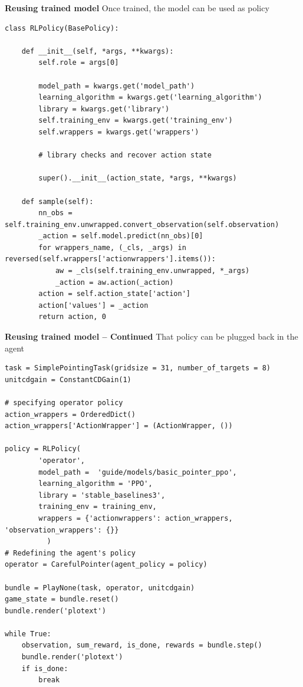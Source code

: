 \documentclass[11pt, xcolor = {dvipsnames}]{beamer}
\begin{document}
\begin{frame}[fragile]{\textbf{Reusing trained model}}
Once trained, the model can be used as policy
\begin{adjustbox}{width=\textwidth}
\lstset{language=Python}
\lstset{frame=lines}
\lstset{basicstyle=\footnotesize}
\begin{lstlisting}
class RLPolicy(BasePolicy):
   
    def __init__(self, *args, **kwargs):
        self.role = args[0]
        
        model_path = kwargs.get('model_path')
        learning_algorithm = kwargs.get('learning_algorithm')
        library = kwargs.get('library')
        self.training_env = kwargs.get('training_env')
        self.wrappers = kwargs.get('wrappers')
        
        # library checks and recover action state

        super().__init__(action_state, *args, **kwargs)

    def sample(self):
        nn_obs = self.training_env.unwrapped.convert_observation(self.observation)
        _action = self.model.predict(nn_obs)[0]
        for wrappers_name, (_cls, _args) in reversed(self.wrappers['actionwrappers'].items()):
            aw = _cls(self.training_env.unwrapped, *_args)
            _action = aw.action(_action)
        action = self.action_state['action']
        action['values'] = _action
        return action, 0
\end{lstlisting}
\end{adjustbox}
\end{frame}

\begin{frame}[fragile]{\textbf{Reusing trained model -- Continued}}
That policy can be plugged back in the agent
\begin{adjustbox}{width=.95\textwidth}
\lstset{language=Python}
\lstset{frame=lines}
\lstset{basicstyle=\footnotesize}
\begin{lstlisting}
task = SimplePointingTask(gridsize = 31, number_of_targets = 8)
unitcdgain = ConstantCDGain(1)

# specifying operator policy
action_wrappers = OrderedDict()
action_wrappers['ActionWrapper'] = (ActionWrapper, ())

policy = RLPolicy(
        'operator',
        model_path =  'guide/models/basic_pointer_ppo',
        learning_algorithm = 'PPO',
        library = 'stable_baselines3',
        training_env = training_env,
        wrappers = {'actionwrappers': action_wrappers, 'observation_wrappers': {}}
          )
# Redefining the agent's policy 
operator = CarefulPointer(agent_policy = policy)

bundle = PlayNone(task, operator, unitcdgain)
game_state = bundle.reset()
bundle.render('plotext')

while True:
    observation, sum_reward, is_done, rewards = bundle.step()
    bundle.render('plotext')
    if is_done:
        break
\end{lstlisting}
\end{adjustbox}
\end{frame}
\end{document}
